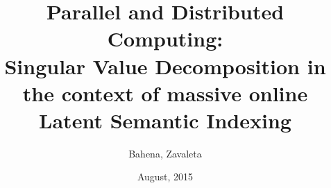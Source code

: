\documentclass{beamer}
\title{Parallel and Distributed Computing: \\Singular Value Decomposition in the
context of massive online Latent Semantic Indexing}
\author{Bahena, Zavaleta}%
\institute{CINVESTAV - ORACLE}
\date{August, 2015}
\begin{document}
	\begin{frame}[plain]
	  \titlepage
	\end{frame}
  
  
  
  
  
  
  
  
  
  
  
  
  
  
  
\end{document}
